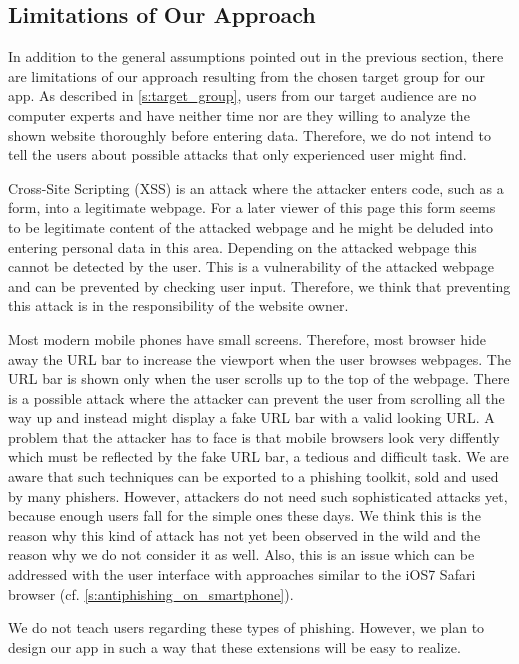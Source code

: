 \subsection{Limitations of Our Approach}
In addition to the general assumptions pointed out in the previous section, there are limitations of our approach resulting from the chosen target group for our app.
As described in \autoref{s:target_group}, users from our target audience are no computer experts and have neither time nor are they willing to analyze the shown website thoroughly before entering data.
Therefore, we do not intend to tell the users about possible attacks that only experienced user might find.
\begin{description}[leftmargin=0cm]
	\item[Cross-Site Scripting]
	Cross-Site Scripting (XSS) is an attack where the attacker enters code, such as a form, into a legitimate webpage.
	For a later viewer of this page this form seems to be legitimate content of the attacked webpage and he might be deluded into entering personal data in this area. 
	Depending on the attacked webpage this cannot be detected by the user.
	This is a vulnerability of the attacked webpage and can be prevented by checking user input.
	Therefore, we think that preventing this attack is in the responsibility of the website owner.
	\item[URL Hiding Techniques]
	Most modern mobile phones have small screens.
	Therefore, most browser hide away the URL bar to increase the viewport when the user browses webpages.
	The URL bar is shown only when the user scrolls up to the top of the webpage.
	There is a possible attack where the attacker can prevent the user from scrolling all the way up and instead might display a fake URL bar with a valid looking URL.
	A problem that the attacker has to face is that mobile browsers look very diffently which must be reflected by the fake URL bar, a tedious and difficult task.
	We are aware that such techniques can be exported to a phishing toolkit, sold and used by many phishers. However, attackers do not need such sophisticated attacks yet, because enough users fall for the simple ones these days. 
	We think this is the reason why this kind of attack has not yet been observed in the wild and the reason why we do not consider it as well.
Also, this is an issue which can be addressed with the user interface with approaches similar to the iOS7 Safari browser (cf. \autoref{s:antiphishing_on_smartphone}).
\end{description}

We do not teach users regarding these types of phishing. However, we plan to design our app in such a way that these extensions will be easy to realize.